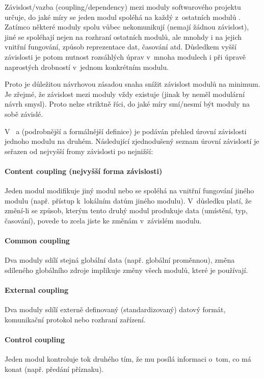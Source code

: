Závislost/vazba (coupling/dependency) mezi moduly softwarového projektu určuje, do jaké míry se jeden modul spoléhá na každý z~ostatních modulů \cite{wiki:coupling}. Zatímco některé moduly spolu vůbec nekomunikují (nemají žádnou závislost), jiné se spoléhají nejen na rozhraní ostatních modulů, ale mnohdy i na jejich vnitřní fungování, způsob reprezentace dat, časování atd. Důsledkem vyšší závislosti je potom nutnost rozsáhlých úprav v~mnoha modulech i při úpravě naprostých drobností v~jednom konkrétním modulu.

Proto je důležitou návrhovou zásadou snaha snížit závislost modulů na minimum. Je zřejmé, že závislost mezi moduly vždy existuje (jinak by neměl modulární návrh smysl). Proto nelze striktně říci, do jaké míry smí/nesmí být moduly na sobě závislé.

V~\cite{wiki:coupling} a \cite{STVR:STVR162} (podrobnější a formálnější definice) je podáván přehled úrovní závislosti jednoho modulu na druhém. Následující zjednodušený seznam úrovní závislostí je seřazen od nejvyšší fromy závislosti po nejnižší:

\paragraph{Content coupling (nejvyšší forma závislosti)} Jeden modul modifikuje jiný modul nebo se spoléhá na vnitřní fungování jiného modulu (např. přístup k~lokálním datům jiného modulu). V~důsledku platí, že změní-li se způsob, kterým tento druhý modul produkuje data (umístění, typ, časování), povede to zcela jiste ke změnám v~závislém modulu.

\paragraph{Common coupling} Dva moduly sdílí stejná globální data (např. globální proměnnou), změna sdíleného globálního zdroje implikuje změny všech modulů, které je používají.

\paragraph{External coupling} Dva moduly sdílí externě definovaný (standardizovaný) datový formát, komunikační protokol nebo rozhraní zařízení.

\paragraph{Control coupling} Jeden modul kontroluje tok druhého tím, že mu posílá informaci o~tom, co má konat (např. předání  příznaku).

